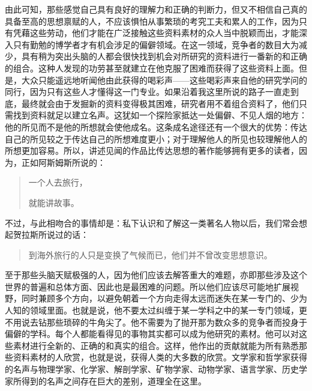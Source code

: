 \documentclass[12pt,oneside]{book}
\begin{document}
由此可知，那些感觉自己具有良好的理解力和正确的判断力，但又不相信自己真的具备至高的思想禀赋的人，不应该惧怕从事繁琐的考究工夫和累人的工作，因为只有凭藉这些劳动，他们才能在广泛接触这些资料素材的众人当中脱颖而出，才能深入只有勤勉的博学者才有机会涉足的偏僻领域。在这一领域，竞争者的数目大为减少，具有稍为突出头脑的人都会很快找到机会对所研究的资料进行一番新的和正确的组合。这种人发现的功劳甚至就建立在他克服了困难而获得了这些资料上面。但是，大众只能遥远地听闻他由此获得的喝彩声——这些喝彩声来自他的研究学问的同行，因为只有这些人才懂得这一门专业。如果沿着我这里所说的路子一直走到底，最终就会由于发掘新的资料变得极其困难，研究者用不着组合资料了，他们只需找到资料就足以建立名声。这犹如一个探险家抵达一处偏僻、不见人烟的地方：他的所见而不是他的所想就会使他成名。这条成名途径还有一个很大的优势：传达自己的所见较之于传达自己的所想难度更小；对于理解他人的所见也较理解他人的所想更加容易。所以，讲述见闻的作品比传达思想的著作能够拥有更多的读者，因为，正如阿斯姆斯所说的： 

 
\begin{quotation}
一个人去旅行， 

就能讲故事。 
\end{quotation}


不过，与此相吻合的事情却是：私下认识和了解这一类著名人物以后，我们常会想起贺拉斯所说过的话： 

 
\begin{quotation}
到海外旅行的人只是变换了气候而已，他们并不曾改变思想意识。 
\end{quotation}
 

至于那些头脑天赋极强的人，因为他们应该去解答重大的难题，亦即那些涉及这个世界的普遍和总体方面、因此也是最困难的问题。所以他们应该尽可能地扩展视野，同时兼顾多个方向，以避免朝着一个方向走得太远而迷失在某一专门的、少为人知的领域里面。也就是说，他不要太过纠缠于某一学科之中的某一专门领域，更不用说去钻那些琐碎的牛角尖了。他不需要为了抛开那为数众多的竞争者而投身于偏僻的学科。每个人都能看得见的事物其实都可以成为他研究的素材。他可以对这些素材进行全新的、正确的和真实的组合。这样，他作出的贡献就能为所有熟悉那些资料素材的人欣赏，也就是说，获得人类的大多数的欣赏。文学家和哲学家获得的名声与物理学家、化学家、解剖学家、矿物学家、动物学家、语言学家、历史学家所得到的名声之间存在巨大的差别，道理全在这里。 




\end{document}
